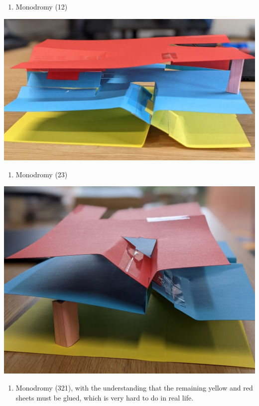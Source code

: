 \documentclass[11pt]{article}
\begin{document}
\begin{enumerate}
\item Monodromy (12)
\end{enumerate}
\begin{center}
\includegraphics[width=.9\linewidth]{assets/Course_notes/2023-03-28_15-28-25_screenshot.png}
\end{center}

\begin{enumerate}
\item Monodromy (23)
\end{enumerate}

\begin{center}
\includegraphics[width=.9\linewidth]{assets/Course_notes/2023-03-28_15-27-51_screenshot.png}
\end{center}

\begin{enumerate}
\item Monodromy (321), with the understanding that the remaining yellow and red sheets must be glued, which is very hard to do in real life.
\end{enumerate}
\end{document}
